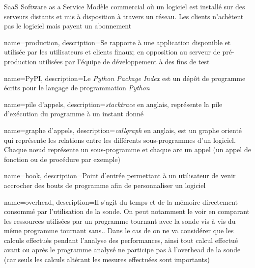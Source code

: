 \usepackage{xparse}
 {
}

  {SaaS}            %
  {Software as a Service}  %
  {Modèle commercial o\`u un logiciel est installé sur des serveurs distants et mis à disposition à travers un réseau. Les clients n'achètent pas le logiciel mais payent un abonnement} %

{
  name=production,
  description=Se rapporte à une application disponible et utilisée par les utilisateurs et clients finaux; en opposition au serveur de pré-production utilisées par l'équipe de développement à des fins de test
}

{
  name=PyPI,
  description=Le \emph{Python Package Index} est un dépôt de programme écrits pour le langage de programmation \emph{Python}
}

{
  name=pile d'appels,
  description={\emph{stacktrace} en anglais, représente la pile d'exécution du programme à un instant donné}
}

{
  name=graphe d'appels,
  description={\emph{callgraph} en anglais, est un graphe orienté qui représente les relations entre les différents sous-programmes d'un logiciel. Chaque nœud représente un sous-programme et chaque arc un appel (un appel de fonction ou de procédure par exemple)}
}

{
  name=hook,
  description=Point d'entrée permettant à un utilisateur de venir accrocher des bouts de programme afin de personnaliser un logiciel
}

{
  name=overhead,
  description={Il s'agit du temps et de la mémoire directement consommé par l'utilisation de la sonde. On peut notamment le voir en comparant les ressources utilisées par un programme tournant avec la sonde vis à vis du même programme tournant sans.. Dans le cas de \Blackfire on ne va considérer que les calculs effectués pendant l'analyse des performances, ainsi tout calcul effectué avant ou après le programme analysé ne participe pas à l'overhead de la sonde (car seuls les calculs altérant les mesures effectuées sont importants)}
}

